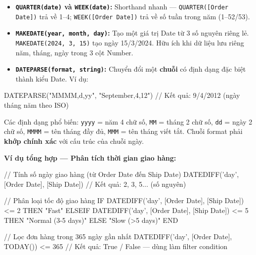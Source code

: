 \documentclass[12pt]{article}
\begin{document}
\begin{itemize}
    \item \textbf{\texttt{QUARTER(date)} và \texttt{WEEK(date)}:} Shorthand nhanh --- \texttt{QUARTER([Order Date])} trả về 1--4; \texttt{WEEK([Order Date])} trả về số tuần trong năm (1--52/53).

    \item \textbf{\texttt{MAKEDATE(year, month, day)}:} Tạo một giá trị Date từ 3 số nguyên riêng lẻ. \texttt{MAKEDATE(2024, 3, 15)} tạo ngày 15/3/2024. Hữu ích khi dữ liệu lưu riêng năm, tháng, ngày trong 3 cột Number.

    \item \textbf{\texttt{DATEPARSE(format, string)}:} Chuyển đổi một \textbf{chuỗi} có định dạng đặc biệt thành kiểu Date. Ví dụ:
\end{itemize}

\begin{aivncodebox}[]
\begin{python}
DATEPARSE("MMMM,d,yy", "September,4,12")
// Kết quả: 9/4/2012 (ngày tháng năm theo ISO)
\end{python}
\end{aivncodebox}

\noindent Các định dạng phổ biến: \texttt{yyyy} = năm 4 chữ số, \texttt{MM} = tháng 2 chữ số, \texttt{dd} = ngày 2 chữ số, \texttt{MMMM} = tên tháng đầy đủ, \texttt{MMM} = tên tháng viết tắt. Chuỗi format phải \textbf{khớp chính xác} với cấu trúc của chuỗi ngày.

\noindent \textbf{Ví dụ tổng hợp --- Phân tích thời gian giao hàng:}

\begin{aivncodebox}[]
\begin{python}
// Tính số ngày giao hàng (từ Order Date đến Ship Date)
DATEDIFF('day', [Order Date], [Ship Date])
// Kết quả: 2, 3, 5... (số nguyên)

// Phân loại tốc độ giao hàng
IF DATEDIFF('day', [Order Date], [Ship Date]) <= 2
THEN "Fast"
ELSEIF DATEDIFF('day', [Order Date], [Ship Date]) <= 5
THEN "Normal (3-5 days)"
ELSE "Slow (>5 days)"
END

// Lọc đơn hàng trong 365 ngày gần nhất
DATEDIFF('day', [Order Date], TODAY()) <= 365
// Kết quả: True / False — dùng làm filter condition
\end{python}
\end{aivncodebox}
\end{document}
